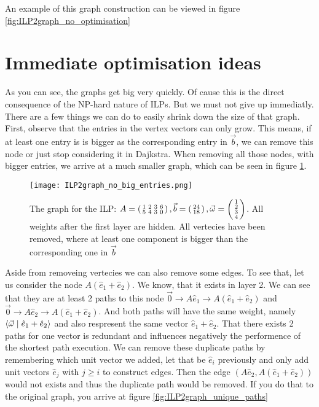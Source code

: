 An example of this graph construction can be viewed in figure \ref{fig:ILP2graph_no_optimisation}

\section{Immediate optimisation ideas}
As you can see, the graphs get big very quickly. Of cause this is the direct consequence of the NP-hard nature of ILPs. But we must not give up immediatly. There are a few things we can do to easily shrink down the size of that graph. First, observe that the entries in the vertex vectors can only grow. This means, if at least one entry is is bigger as the corresponding entry in $\vec b$, we can remove this node or just stop considering it in Dajkstra. When removing all those nodes, with bigger entries, we arrive at a much smaller graph, which can be seen in figure \ref{fig:ILP2graph_no_big_entries}.

\begin{figure}
    \texttt{[image: ILP2graph\_no\_big\_entries.png]}
    \caption{\label{fig:ILP2graph_no_big_entries}The graph for the ILP: $A = \left(\begin{smallmatrix}1&2&3&6\\5&4&3&0\end{smallmatrix}\right), \vec b = \left(\begin{smallmatrix}24\\18\end{smallmatrix}\right), \vec \omega = \left(\begin{smallmatrix}1\\2\\3\\4\end{smallmatrix}\right)$. All weights after the first layer are hidden. All vertecies have been removed, where at least one component is bigger than the corresponding one in $\vec b$}
\end{figure}

Aside from removeing vertecies we can also remove some edges. To see that, let us consider the node $A(\hat e_1 + \hat e_2)$. We know, that it exists in layer 2. We can see that they are at least 2 paths to this node $\vec 0 \rightarrow A\hat e_1 \rightarrow A(\hat e_1 + \hat e_2)$ and $\vec 0 \rightarrow A\hat e_2 \rightarrow A(\hat e_1 + \hat e_2)$. And both paths will have the same weight, namely $\langle \vec \omega \mid \hat e_1 + \hat e_2 \rangle$ and also respresent the same vector $\hat e_1 + \hat e_2$. That there exists 2 paths for one vector is redundant and influences negatively the performence of the shortest path execution. We can remove these duplicate paths by remembering which unit vector we added, let that be $\hat e_i$ previously and only add unit vectors $\hat e_j$ with $j \geq i$ to construct edges. Then the edge $(A\hat e_2, A(\hat e_1 + \hat e_2))$ would not exists and thus the duplicate path would be removed. If you do that to the original graph, you arrive at figure \ref{fig:ILP2graph_unique_paths}

